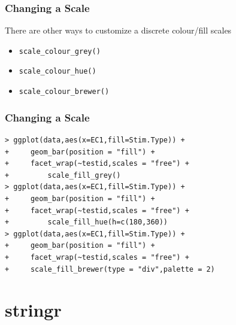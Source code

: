 \documentclass[xcolor={table},c]{beamer}
\begin{document}
\begin{frame}[fragile]\frametitle{Changing a Scale}
There are other ways to customize a discrete colour/fill scales
  \begin{itemize}
  \item \texttt{scale\_colour\_grey()}
  \item \texttt{scale\_colour\_hue()}
  \item \texttt{scale\_colour\_brewer()}
  \end{itemize}
\end{frame}

\begin{frame}[fragile]\frametitle{Changing a Scale}
\begin{verbatim}
> ggplot(data,aes(x=EC1,fill=Stim.Type)) +
+     geom_bar(position = "fill") +
+     facet_wrap(~testid,scales = "free") +
+         scale_fill_grey()
> ggplot(data,aes(x=EC1,fill=Stim.Type)) +
+     geom_bar(position = "fill") +
+     facet_wrap(~testid,scales = "free") +
+         scale_fill_hue(h=c(180,360))
> ggplot(data,aes(x=EC1,fill=Stim.Type)) +
+     geom_bar(position = "fill") +
+     facet_wrap(~testid,scales = "free") +
+     scale_fill_brewer(type = "div",palette = 2)
\end{verbatim}
\end{frame}


\section{stringr}






\end{document}
